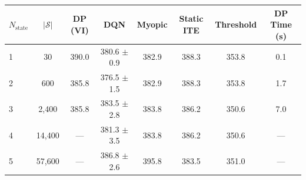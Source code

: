 \begin{tabular}{lccccccc}
\toprule
$N_{\mathrm{state}}$ & $|\mathcal{S}|$ & DP (VI) & DQN & Myopic & Static ITE & Threshold & DP Time (s) \\
\midrule
1 & 30 & 390.0 & 380.6 $\pm$ 0.9 & 382.9 & 388.3 & 353.8 & 0.1 \\
2 & 600 & 385.8 & 376.5 $\pm$ 1.5 & 382.9 & 388.3 & 353.8 & 1.7 \\
3 & 2,400 & 385.8 & 383.5 $\pm$ 2.8 & 383.8 & 386.2 & 350.6 & 7.0 \\
4 & 14,400 & --- & 381.3 $\pm$ 3.5 & 383.8 & 386.2 & 350.6 & --- \\
5 & 57,600 & --- & 386.8 $\pm$ 2.6 & 395.8 & 383.5 & 351.0 & --- \\
\bottomrule
\end{tabular}